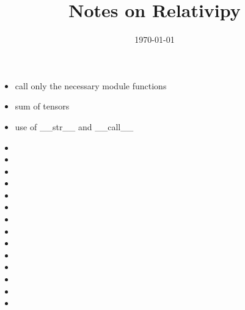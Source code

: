 \documentclass[12pt]{article}
\title{Notes on Relativipy}
\date{\today}
\begin{document}
\maketitle


\begin{itemize}
	\item call only the necessary module functions
	\item sum of tensors
	\item use of \_\_str\_\_ and \_\_call\_\_
	\item
	\item
	\item
	\item
	\item
	\item
	\item
	\item
	\item
	\item
	\item
	\item
	\item
	\item
\end{itemize}
\end{document}
